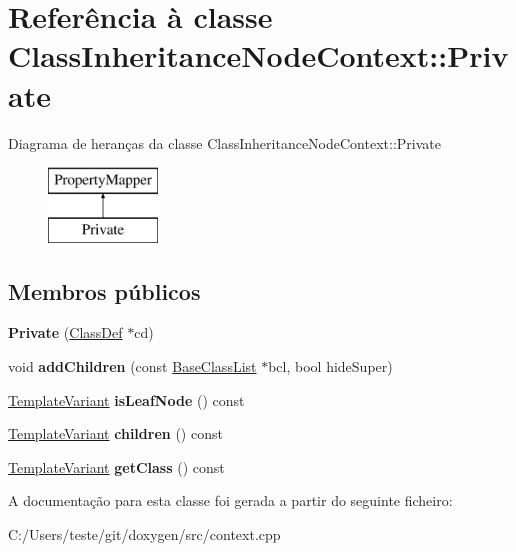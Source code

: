 \hypertarget{class_class_inheritance_node_context_1_1_private}{\section{Referência à classe Class\-Inheritance\-Node\-Context\-:\-:Private}
\label{class_class_inheritance_node_context_1_1_private}
}
Diagrama de heranças da classe Class\-Inheritance\-Node\-Context\-:\-:Private\begin{figure}[H]
\begin{center}
\leavevmode
\includegraphics[height=2.000000cm]{class_class_inheritance_node_context_1_1_private}
\end{center}
\end{figure}
\subsection*{Membros públicos}
\begin{DoxyCompactItemize}
\item 
\hypertarget{class_class_inheritance_node_context_1_1_private_abe01fd2e5b3c6079bb23798abddfefb6}{{\bfseries Private} (\hyperlink{class_class_def}{Class\-Def} $\ast$cd)}\label{class_class_inheritance_node_context_1_1_private_abe01fd2e5b3c6079bb23798abddfefb6}

\item 
\hypertarget{class_class_inheritance_node_context_1_1_private_ab0dba386b4767dd0290754724d47af42}{void {\bfseries add\-Children} (const \hyperlink{class_base_class_list}{Base\-Class\-List} $\ast$bcl, bool hide\-Super)}\label{class_class_inheritance_node_context_1_1_private_ab0dba386b4767dd0290754724d47af42}

\item 
\hypertarget{class_class_inheritance_node_context_1_1_private_a294b828ee5cfccceb76c68a2a2c94965}{\hyperlink{class_template_variant}{Template\-Variant} {\bfseries is\-Leaf\-Node} () const }\label{class_class_inheritance_node_context_1_1_private_a294b828ee5cfccceb76c68a2a2c94965}

\item 
\hypertarget{class_class_inheritance_node_context_1_1_private_aca10906ad6f957c2696e917548979f46}{\hyperlink{class_template_variant}{Template\-Variant} {\bfseries children} () const }\label{class_class_inheritance_node_context_1_1_private_aca10906ad6f957c2696e917548979f46}

\item 
\hypertarget{class_class_inheritance_node_context_1_1_private_abb8d0e1899ad3cd8458a1f592045493d}{\hyperlink{class_template_variant}{Template\-Variant} {\bfseries get\-Class} () const }\label{class_class_inheritance_node_context_1_1_private_abb8d0e1899ad3cd8458a1f592045493d}

\end{DoxyCompactItemize}


A documentação para esta classe foi gerada a partir do seguinte ficheiro\-:\begin{DoxyCompactItemize}
\item 
C\-:/\-Users/teste/git/doxygen/src/context.\-cpp\end{DoxyCompactItemize}
